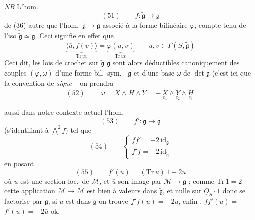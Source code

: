 \documentclass[11pt,a4paper]{article}
\begin{document}
\emph{NB} L'hom.\ 
\[
  (51) \qquad f : \widetilde{\mathfrak{g}} \longrightarrow \mathfrak{g}
\]
de (36)  autre que l'hom.\ $\widetilde{\mathfrak{g}} \to
\check{\widetilde{\mathfrak{g}}}$ associé à la forme bilinéaire $\varphi$,
compte tenu de l'iso $\check{\widetilde{\mathfrak{g}}} \simeq \mathfrak{g}$.
Ceci signifie en effet que
\[
  \underbrace{\langle \bar{u}, f(v) \rangle}_{\mathrm{Tr}\, uv}
  = \underbrace{\varphi(u, v)}_{\mathrm{Tr}\, uv}
  \qquad u, v \in \Gamma(S, \widetilde{\mathfrak{g}})
\]
Ceci dit, les lois de crochet sur $\widetilde{\mathfrak{g}}$  \ill{}
\ill{} $\mathfrak{g}$ sont alors déductibles canoniquement  des
couples $(\varphi, \omega)$ d'une forme bil.\ sym.\ 
$\widetilde{\mathfrak{g}}$ et d'une base $\omega$ de $\det \widetilde{\mathfrak{g}}$
(c'est ici que la convention de \emph{signe}  
-- on prendra
\[
  (52) \qquad \boxed{\ \omega = \widetilde{X} \wedge \widetilde{H} \wedge \widetilde{Y}
  = -\,\underset{e_1}{\widetilde{X}} \wedge \underset{e_2}{\widetilde{Y}} \wedge \underset{e_3}{\widetilde{H}}\ }
\]
\ill{}

\struck{\ill{}}  aussi  dans notre contexte actuel l'hom.
\[
  (53) \qquad f' : \mathfrak{g} \longrightarrow \widetilde{\mathfrak{g}}
\]
(s'identifiant à ${\textstyle\bigwedge^2} f$) tel que
\[
  (54) \qquad \left\lbrace
  \begin{array}{l}
    f f' = -2\, \mathrm{id}_{\mathfrak{g}} \\
    f' f = -2\, \mathrm{id}_{\widetilde{\mathfrak{g}}}
  \end{array}\right.
\]
en posant
\[
  (55) \qquad f'(\bar{u}) = (\mathrm{Tr}\, u)\, 1 - 2u
\]
où $u$ est une section loc.\ de $\mathcal{M}$, et $\bar{u}$ son image par
$\mathcal{M} \to \mathfrak{g}$ ; comme $\mathrm{Tr}\, 1 = 2$ cette application
\struck{\ill{}} $\mathcal{M} \to \mathcal{M}$ est bien à valeurs dans
$\widetilde{\mathfrak{g}}$, et nulle sur $\underline{O}_S \cdot 1$ donc se factorise
par $\mathfrak{g}$,  si $u$ est dans $\widetilde{\mathfrak{g}}$ on
trouve $f'f(u) = -2u$, enfin \ill{}, $f f'(\bar{u}) =$ \struck{\ill{}}
$\overline{f'(u)} = -2\bar{u}$ ok.
\end{document}
